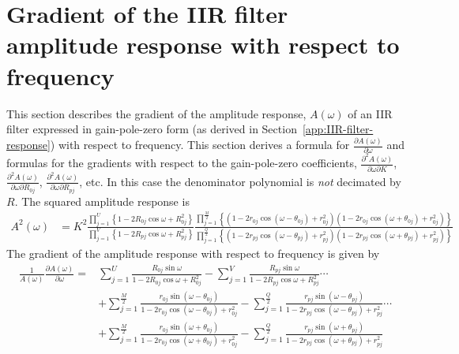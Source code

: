 \documentclass[a4paper,twoside,10pt,english]{report}
\begin{document}
\chapter{\label{app:Gradient-IIR-filter-amplitude-response-wrt-frequency}Gradient of the IIR filter amplitude response with respect to frequency}
This section describes the gradient of the amplitude response, 
$A\left(\omega\right)$ of an IIR filter expressed in gain-pole-zero form (as 
derived in Section~\ref{app:IIR-filter-response}) with respect to frequency.
This section derives a formula for 
$\frac{\partial A\left(\omega\right)}{\partial\omega}$ and
formulas for the gradients with respect to the gain-pole-zero coefficients, 
 $\frac{\partial^{2} A\left(\omega\right)}{\partial\omega\partial K}$,
 $\frac{\partial^{2} A\left(\omega\right)}{\partial\omega\partial R_{0j}}$,
 $\frac{\partial^{2} A\left(\omega\right)}{\partial\omega\partial R_{pj}}$, etc.
In this case the denominator polynomial is \emph{not} decimated by $R$. 
The squared amplitude response is 
\begin{align*}
A^{2}\left(\omega\right) &= K^{2}
\frac{\prod_{j=1}^{U}\left\{ 1-2R_{0j}\cos\omega+R_{0j}^{2}\right\}}
{\prod_{j=1}^{V}\left\{ 1-2R_{pj}\cos\omega + R_{pj}^{2}\right\}}
\frac{\prod_{j=1}^{\frac{M}{2}}
\left\{\left(1-2r_{0j}\cos\left(\omega-\theta_{0j}\right)+r_{0j}^{2}\right)
\left(1-2r_{0j}\cos\left(\omega+\theta_{0j}\right)+r_{0j}^{2}\right)\right\}}
{\prod_{j=1}^{\frac{Q}{2}}
\left\{\left(1-2r_{pj}\cos\left(\omega-\theta_{pj}\right)+r_{pj}^{2}\right)
\left(1-2r_{pj}\cos\left(\omega+\theta_{pj}\right)+r_{pj}^{2}\right)\right\}}
\end{align*}
The gradient of the amplitude response with respect to frequency is given by
\begin{align*}
\frac{1}{A\left(\omega\right)}
\frac{\partial A\left(\omega\right)}{\partial\omega} = 
&\sum_{j=1}^{U}\frac{R_{0j}\sin\omega}{1-2R_{0j}\cos\omega + R_{0j}^{2}}
-\sum_{j=1}^{V}\frac{R_{pj}\sin\omega}{1-2R_{pj}\cos\omega + R_{pj}^{2}}\cdots\\
&+\sum_{j=1}^{\frac{M}{2}}\frac{r_{0j}\sin\left(\omega-\theta_{0j}\right)} 
{1-2r_{0j}\cos\left(\omega-\theta_{0j}\right) + r_{0j}^{2}}
-\sum_{j=1}^{\frac{Q}{2}}\frac{r_{pj}\sin\left(\omega-\theta_{pj}\right)} 
{1-2r_{pj}\cos\left(\omega-\theta_{pj}\right) + r_{pj}^{2}}\cdots\\
&+\sum_{j=1}^{\frac{M}{2}}\frac{r_{0j}\sin\left(\omega+\theta_{0j}\right)} 
{1-2r_{0j}\cos\left(\omega+\theta_{0j}\right) + r_{0j}^{2}}
-\sum_{j=1}^{\frac{Q}{2}}\frac{r_{pj}\sin\left(\omega+\theta_{pj}\right)} 
{1-2r_{pj}\cos\left(\omega+\theta_{pj}\right) + r_{pj}^{2}}
\end{align*}
\end{document}
